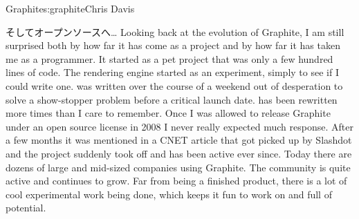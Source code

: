 \begin{aosachapter}{Graphite}{s:graphite}{Chris Davis}
\begin{aosasect1}{そしてオープンソースへ…}
Looking back at the evolution of Graphite, I am still surprised both by
how far it has come as a project and by how far it has taken me as a
programmer. It started as a pet project that was only a few hundred
lines of code. The rendering engine started as an experiment, simply
to see if I could write one.  was written over the course of a
weekend out of desperation to solve a show-stopper problem before a
critical launch date.  has been rewritten more times than I care
to remember. Once I was allowed to release Graphite under an open
source license in 2008 I never really expected much response. After a
few months it was mentioned in a CNET article that got picked up by
Slashdot and the project suddenly took off and has been active ever
since.  Today there are dozens of large and mid-sized companies using
Graphite. The community is quite active and
continues to grow. Far from being a finished product, there is a lot
of cool experimental work being done, which keeps it fun to work on
and full of potential.

\end{aosasect1}

\end{aosachapter}
